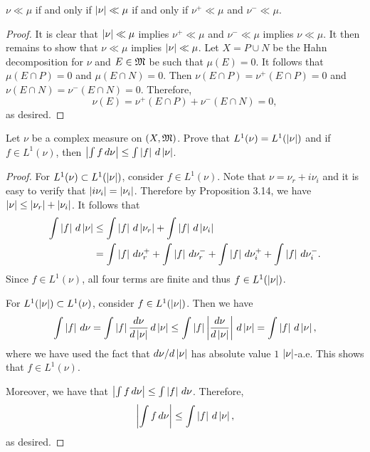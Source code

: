 \documentclass[a4paper]{article}
\begin{document}
\begin{ex}[Folland 3.8]
$\nu \ll \mu$ if and only if $\left\lvert \nu\right\rvert \ll \mu$ 
if and only if $\nu^+ \ll \mu$ and $\nu^- \ll \mu$.
\end{ex}

\begin{proof}
It is clear that $\left\lvert \nu\right\rvert \ll \mu$ implies 
$\nu^+ \ll \mu$ and $\nu^- \ll \mu$ implies 
$\nu \ll \mu$. It then remains to show that $\nu \ll \mu$ 
implies $\left\lvert \nu\right\rvert \ll \mu$. Let $X = P \cup N$ be the Hahn 
decomposition for $\nu$ and $E \in \mathfrak{M}$ be such that 
$\mu(E) = 0$. It follows that 
$\mu(E \cap P) = 0$ and $\mu (E \cap N) = 0$. Then 
$\nu(E \cap P) = \nu^+ (E \cap P) = 0$ and 
$\nu(E \cap N) = \nu^- (E \cap N) = 0$. Therefore, 
\[
\nu (E) = \nu^+ (E \cap P) + \nu^- (E \cap N) = 0,
\]
as desired.
\end{proof}


\begin{ex}[Folland 3.18]
Let $\nu$ be a complex measure on $(X, \mathfrak{M})$. Prove that 
$L^1 (\nu) = L^1 (\left\lvert \nu\right\rvert)$ and if $f \in L^1 (\nu)$, then 
$\left\lvert \int f \, d \nu\right\rvert \leq \int \left\lvert f\right\rvert \, d \left\lvert \nu\right\rvert$.
\end{ex}

\begin{proof}
For $L^1 (\nu) \subset L^1 (\left\lvert \nu\right\rvert)$, consider $f \in L^1 (\nu)$.
Note that $\nu = \nu_r + i \nu_i$ and it is easy to 
verify that $\left\lvert i \nu_i\right\rvert = \left\lvert \nu_i\right\rvert$.
Therefore by Proposition 3.14, we have $\left\lvert \nu\right\rvert \leq 
\left\lvert \nu_r\right\rvert + \left\lvert \nu_i\right\rvert$. It follows that 
\[
\begin{aligned}
\int \left\lvert f\right\rvert \, d \left\lvert \nu\right\rvert 
&\leq \int \left\lvert f\right\rvert \, d \left\lvert \nu_r\right\rvert + \int \left\lvert f\right\rvert \, d
\left\lvert \nu_i\right\rvert \\
&= \int \left\lvert f\right\rvert \, d \nu_r^+ + \int \left\lvert f\right\rvert \, d \nu_r^- 
+ \int \left\lvert f\right\rvert \, d \nu_i^+ + \int \left\lvert f\right\rvert \, d \nu_i^-.
\end{aligned}
\]
Since $f \in L^1 (\nu)$, all four terms are finite and thus 
$f \in L^1 (\left\lvert \nu\right\rvert)$. 

For $L^1 (\left\lvert \nu\right\rvert) \subset L^1 (\nu)$, consider $f \in L^1 
(\left\lvert \nu\right\rvert)$. Then we have 
\[
\int \left\lvert f\right\rvert \, d \nu 
= \int \left\lvert f\right\rvert \frac{d \nu}{d \left\lvert \nu\right\rvert} \, d \left\lvert \nu\right\rvert 
\leq \int \left\lvert f\right\rvert \left\lvert \frac{d \nu}{d \left\lvert \nu\right\rvert}\right\rvert \, d \left\lvert \nu\right\rvert 
= \int \left\lvert f\right\rvert \, d \left\lvert \nu\right\rvert,
\]
where we have used the fact that $d \nu / d \left\lvert \nu\right\rvert$ has 
absolute value $1$ $\left\lvert \nu\right\rvert$-a.e. This shows that 
$f \in L^1 (\nu)$. 

Moreover, we have that $\left\lvert \int f \, d \nu\right\rvert 
\leq \int \left\lvert f\right\rvert \, d \nu$. Therefore,
\[
\left\lvert \int f \, d \nu\right\rvert \leq \int \left\lvert f\right\rvert \, d \left\lvert \nu\right\rvert,
\]
as desired.
\end{proof}
\end{document}
